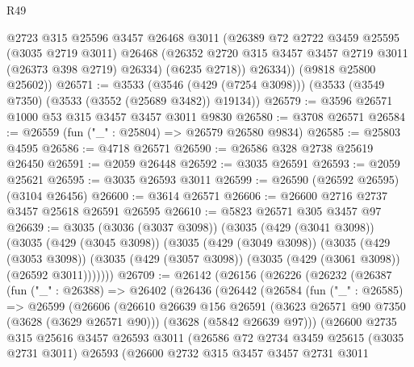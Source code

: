 \begin{lexlean}{R49}
\begin{coremodule}
          @2723
          @315
          @25596
          @3457
          @26468
          @3011
          (@26389
            @72
            @2722
            @3459
            @25595
            (@3035 @2719 @3011)
            @26468
            (@26352 @2720 @315 @3457 @3457 @2719 @3011 (@26373 @398 @2719) @26334)
            (@6235 @2718))
          @26334))
      (@9818 @25800 @25602))
@26571 := @3533
    (@3546 (@429 (@7254 @3098)))
    (@3533 (@3549 @7350) (@3533 (@3552 (@25689 @3482)) @19134))
@26579 := @3596 @26571 @1000 @53 @315 @3457 @3457 @3011 @9830
@26580 := @3708 @26571
@26584 := @26559 (fun ("_" : @25804) => @26579 @26580 @9834)
@26585 := @25803 @4595
@26586 := @4718 @26571
@26590 := @26586 @328 @2738 @25619 @26450
@26591 := @2059 @26448
@26592 := @3035 @26591
@26593 := @2059 @25621
@26595 := @3035 @26593 @3011
@26599 := @26590 (@26592 @26595) (@3104 @26456)
@26600 := @3614 @26571
@26606 := @26600 @2716 @2737 @3457 @25618 @26591 @26595
@26610 := @5823 @26571 @305 @3457 @97
@26639 := @3035
    (@3036 (@3037 @3098))
    (@3035
      (@429 (@3041 @3098))
      (@3035
        (@429 (@3045 @3098))
        (@3035
          (@429 (@3049 @3098))
          (@3035
            (@429 (@3053 @3098))
            (@3035 (@429 (@3057 @3098)) (@3035 (@429 (@3061 @3098)) (@26592 @3011)))))))
@26709 := @26142
    (@26156
      (@26226
        (@26232
          (@26387
            (fun ("_" : @26388) =>
            @26402
              (@26436
                (@26442
                  (@26584
                    (fun ("_" : @26585) =>
                    @26599
                      (@26606
                        (@26610
                          @26639
                          @156
                          @26591
                          (@3623 @26571 @90 @7350 (@3628 (@3629 @26571 @90)))
                          (@3628 (@5842 @26639 @97)))
                        (@26600
                          @2735
                          @315
                          @25616
                          @3457
                          @26593
                          @3011
                          (@26586
                            @72
                            @2734
                            @3459
                            @25615
                            (@3035 @2731 @3011)
                            @26593
                            (@26600
                              @2732
                              @315
                              @3457
                              @3457
                              @2731
                              @3011

\end{coremodule}
\end{lexlean}
